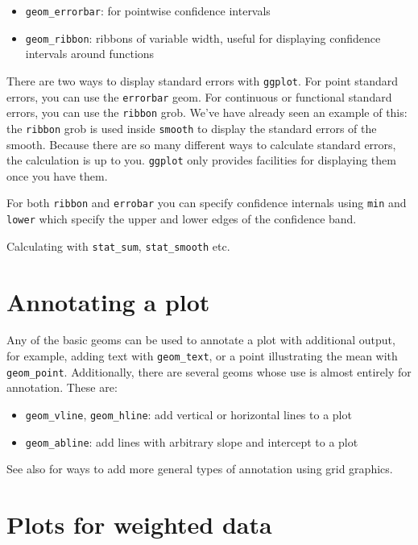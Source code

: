 \begin{itemize}
	\item {\tt geom\_errorbar}: for pointwise confidence intervals
	\item {\tt geom\_ribbon}: ribbons of variable width, useful for displaying confidence intervals around functions
\end{itemize}

There are two ways to display standard errors with {\tt ggplot}.  For point standard errors, you can use the {\tt errorbar} geom.  For continuous or functional standard errors, you can use the {\tt ribbon} grob.  We've have already seen an example of this: the {\tt ribbon} grob is used inside {\tt smooth} to display the standard errors of the smooth.  Because there are so many different ways to calculate standard errors, the calculation is up to you.  {\tt ggplot} only provides facilities for displaying them once you have them.

For both {\tt ribbon} and {\tt errobar} you can specify confidence internals using {\tt min} and {\tt lower} which specify the upper and lower edges of the confidence band.

Calculating with {\tt stat\_sum}, {\tt stat\_smooth} etc.

\section{Annotating a plot}\label{sub:annotating_a_plot}

Any of the basic geoms can be used to annotate a plot with additional output, for example, adding text with {\tt geom\_text}, or a point illustrating the mean with {\tt geom\_point}.  Additionally, there are several geoms whose use is almost entirely for annotation.  These are:

\begin{itemize}
	\item {\tt geom\_vline}, {\tt geom\_hline}: add vertical or horizontal lines to a plot
	\item {\tt geom\_abline}: add lines with arbitrary slope and intercept to a plot
\end{itemize}

See also  for ways to add more general types of annotation using grid graphics.

\section{Plots for weighted data}\label{sec:weighted_data}

